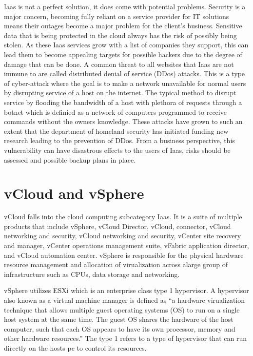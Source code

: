\documentclass[9pt,twocolumn,twoside]{../../styles/osajnl}
\begin{document}
Iaas is not a perfect solution, it does come with potential problems.
Security is a major concern, becoming fully reliant on a service
provider for IT solutions means their outages become a major problem
for the client’s business.  Sensitive data that is being protected in
the cloud always has the risk of possibly being stolen.  As these Iaas
services grow with a list of companies they support, this can lead
them to become appealing targets for possible hackers due to the
degree of damage that can be done.  A common threat to all websites
that Iaas are not immune to are called distributed denial of service
(DDos) attacks.  This is a type of cyber-attack where the goal is to
make a network unavailable for normal users by disrupting service of a
host on the internet. \cite{www-wikipedia} The typical method to
disrupt service by flooding the bandwidth of a host with plethora of
requests through a botnet which is definied as a network of computers
programmed to receive commands without the owners knowledge.  These
attacks have grown to such an extent that the department of homeland
security has initiated funding new research leading to the prevention
of DDos. \cite{www-ciodive} From a business perspective, this
vulnerability can have disastrous effects to the users of Iaas, risks
should be assessed and possible backup plans in place.

\section{vCloud and vSphere}

vCloud falls into the cloud computing subcategory Iaas.  It is a suite
of multiple products that include vSphere, vCloud Director, vCloud,
connector, vCloud networking and security, vCloud networking and
security, vCenter site recovery and manager, vCenter operations
management suite, vFabric application director, and vCloud automation
center.  vSphere is responsible for the physical hardware resource
management and allocation of virualization across alarge group of
infrastructure such as CPUs, data storage and networking.

vSphere utilizes ESXi which is an enterprise class type 1 hypervisor.  A
hypervisor also known as a virtual machine manager is defined as “a
hardware virualization technique that allows multiple guest operating
systems (OS) to run on a single host system at the same time.  The
guest OS shares the hardware of the host computer, such that each OS
appears to have its own processor, memory and other hardware
resources.” \cite{www-technopedia} The type 1 refers to a type of
hypervisor that can run directly on the hosts pc to control its
resources.
\end{document}
